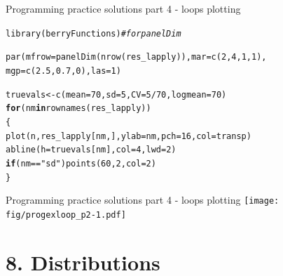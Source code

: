 \documentclass[xcolor=table,       handout,    xcolor=dvipsnames]{beamer}\usepackage[]{graphicx}\usepackage[]{color}
\makeatletter
\newcommand{\hlnum}[1]{\textcolor[rgb]{0,0,0}{#1}}
\newcommand{\hlstr}[1]{\textcolor[rgb]{0.545,0.137,0.137}{#1}}
\newcommand{\hlcom}[1]{\textcolor[rgb]{0,0.392,0}{\textit{#1}}}
\newcommand{\hlopt}[1]{\textcolor[rgb]{0,0,0}{#1}}
\newcommand{\hlstd}[1]{\textcolor[rgb]{0,0,0}{#1}}
\newcommand{\hlkwa}[1]{\textcolor[rgb]{1,0,0}{\textbf{#1}}}
\newcommand{\hlkwb}[1]{\textcolor[rgb]{0,0,0}{#1}}
\newcommand{\hlkwc}[1]{\textcolor[rgb]{1,0,1}{#1}}
\newcommand{\hlkwd}[1]{\textcolor[rgb]{0,0,1}{#1}}
\newenvironment{kframe}{%
 \def\at@end@of@kframe{}%
 \ifinner\ifhmode%
  \def\at@end@of@kframe{\end{minipage}}%
  \begin{minipage}{\columnwidth}%
 \fi\fi%
 \def\FrameCommand##1{\hskip\@totalleftmargin \hskip-\fboxsep
 \colorbox{shadecolor}{##1}\hskip-\fboxsep
     \hskip-\linewidth \hskip-\@totalleftmargin \hskip\columnwidth}%
 \MakeFramed {\advance\hsize-\width
   \@totalleftmargin\z@ \linewidth\hsize
   \@setminipage}}%
 {\par\unskip\endMakeFramed%
 \at@end@of@kframe}
\newenvironment{knitrout}{}{} %
\makeatother
\begin{document}
\begin{frame}[fragile]{Programming practice solutions part 4 - loops plotting}
\begin{knitrout}
\color{fgcolor}\begin{kframe}
\begin{alltt}
\hlkwd{library}\hlstd{(berryFunctions)} \hlcom{# for panelDim}

\hlkwd{par}\hlstd{(}\hlkwc{mfrow}\hlstd{=}\hlkwd{panelDim}\hlstd{(}\hlkwd{nrow}\hlstd{(res_lapply)),} \hlkwc{mar}\hlstd{=}\hlkwd{c}\hlstd{(}\hlnum{2}\hlstd{,}\hlnum{4}\hlstd{,}\hlnum{1}\hlstd{,}\hlnum{1}\hlstd{),}
    \hlkwc{mgp}\hlstd{=}\hlkwd{c}\hlstd{(}\hlnum{2.5}\hlstd{,}\hlnum{0.7}\hlstd{,}\hlnum{0}\hlstd{),} \hlkwc{las}\hlstd{=}\hlnum{1} \hlstd{)}

\hlstd{truevals} \hlkwb{<-} \hlkwd{c}\hlstd{(}\hlkwc{mean}\hlstd{=}\hlnum{70}\hlstd{,} \hlkwc{sd}\hlstd{=}\hlnum{5}\hlstd{,} \hlkwc{CV}\hlstd{=}\hlnum{5}\hlopt{/}\hlnum{70}\hlstd{,} \hlkwc{logmean}\hlstd{=}\hlnum{70}\hlstd{)}
\hlkwa{for}\hlstd{(nm} \hlkwa{in} \hlkwd{rownames}\hlstd{(res_lapply))}
  \hlstd{\{}
  \hlkwd{plot}\hlstd{(n, res_lapply[nm, ],} \hlkwc{ylab}\hlstd{=nm,} \hlkwc{pch}\hlstd{=}\hlnum{16}\hlstd{,} \hlkwc{col}\hlstd{=transp)}
  \hlkwd{abline}\hlstd{(}\hlkwc{h}\hlstd{=truevals[nm],} \hlkwc{col}\hlstd{=}\hlnum{4}\hlstd{,} \hlkwc{lwd}\hlstd{=}\hlnum{2}\hlstd{)}
  \hlkwa{if}\hlstd{(nm}\hlopt{==}\hlstr{"sd"}\hlstd{)} \hlkwd{points}\hlstd{(}\hlnum{60}\hlstd{,}\hlnum{2}\hlstd{,} \hlkwc{col}\hlstd{=}\hlnum{2}\hlstd{)}
  \hlstd{\}}
\end{alltt}
\end{kframe}
\end{knitrout}
\end{frame}


\begin{frame}[fragile]{Programming practice solutions part 4 - loops plotting}
\texttt{[image: fig/progexloop\_p2-1.pdf]}
\end{frame}

\section{8. Distributions}
\end{document}
